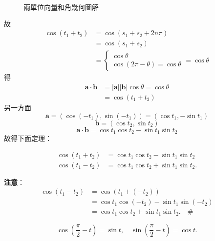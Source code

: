 \begin{figure}[H]
\caption{兩單位向量和角幾何圖解}
\label{fig:b3-fig3-46}
\end{figure}

故
\begin{align*}
\cos(t_1 + t_2) &= \cos(s_1 + s_2 + 2n\pi) \\
&= \cos(s_1 + s_2) \\
&= \begin{cases} \cos\theta \\ \cos(2\pi - \theta) = \cos\theta \end{cases} = \cos\theta
\end{align*}
得
\begin{align*}
\mathbf{a}\cdot\mathbf{b} &= |\mathbf{a}||\mathbf{b}|\cos\theta = \cos\theta \\
&= \cos(t_1 + t_2)
\end{align*}
另一方面
\[ \mathbf{a} = (\cos(-t_1), \sin(-t_1)) = (\cos t_1, -\sin t_1) \]
\[ \mathbf{b} = (\cos t_2, \sin t_2) \]
\[ \mathbf{a}\cdot\mathbf{b} = \cos t_1\cos t_2 - \sin t_1\sin t_2 \]
故得下面定理：

\begin{theorem}[餘弦和角公式]
\begin{align*}
\cos(t_1 + t_2) &= \cos t_1\cos t_2 - \sin t_1\sin t_2 \\
\cos(t_1 - t_2) &= \cos t_1\cos t_2 + \sin t_1\sin t_2.
\end{align*}
\end{theorem}

\textbf{注意}：
\begin{align*}
\cos(t_1 - t_2) &= \cos(t_1 + (-t_2)) \\
&= \cos t_1\cos(-t_2) - \sin t_1\sin(-t_2) \\
&= \cos t_1\cos t_2 + \sin t_1\sin t_2. \quad \#
\end{align*}

\begin{proposition}
\[ \cos\left(\frac{\pi}{2} - t\right) = \sin t, \quad \sin\left(\frac{\pi}{2} - t\right) = \cos t. \]
\end{proposition}

